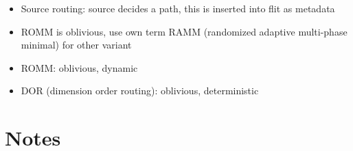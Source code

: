 \begin{itemize}
\begin{itemize}
\begin{itemize}
                    \item Source routing: source decides a path, this is inserted into flit as metadata
                    \item ROMM is oblivious, use own term RAMM (randomized adaptive multi-phase minimal) for other variant
                    \item ROMM: oblivious, dynamic
                    \item DOR (dimension order routing): oblivious, deterministic
                \end{itemize}
        \end{itemize}
\end{itemize}

\iffalse
\section{Notes}
